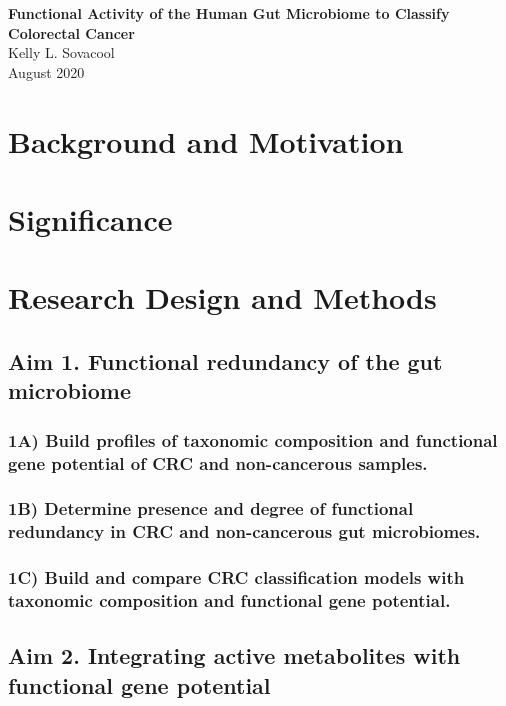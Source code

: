 \documentclass[11pt]{article}
\begin{document}
\sloppy
\begin{center}
\large{\textbf{
    Functional Activity of the Human Gut Microbiome to Classify Colorectal Cancer
}} \\
\vspace{11pt}
\small{
    Kelly L. Sovacool \\
    August 2020
}
\end{center}



\section*{Background and Motivation} %

\section*{Significance} %


\section*{Research Design and Methods}

\subsection*{Aim 1. Functional redundancy of the gut microbiome}

\subsubsection*{1A) Build profiles of taxonomic composition and functional gene potential of CRC and non-cancerous samples.}

\subsubsection*{1B) Determine presence and degree of functional redundancy in CRC and non-cancerous gut microbiomes.}

\subsubsection*{1C) Build and compare CRC classification models with taxonomic composition and functional gene potential.}


\subsection*{Aim 2. Integrating active metabolites with functional gene potential}
\end{document}

